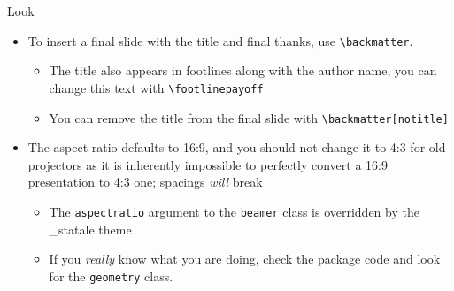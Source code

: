 \begin{frame}[fragile]{Look}
\begin{itemize}
    \item To insert a final slide with the title and final thanks, use \verb|\backmatter|.
    \begin{itemize}
        \item The title also appears in footlines along with the author name, you can change this text with \verb|\footlinepayoff|
        \item You can remove the title from the final slide with \verb|\backmatter[notitle]|
    \end{itemize}
    \item The aspect ratio defaults to 16:9, and you should not change it to 4:3 for old projectors as it is inherently impossible to perfectly convert a 16:9 presentation to 4:3 one; spacings \emph{will} break
    \begin{itemize}
        \item The \texttt{aspectratio} argument to the \texttt{beamer} class is overridden by the \_statale theme
        \item If you \emph{really} know what you are doing, check the package code and look for the \texttt{geometry} class.
    \end{itemize}
\end{itemize}
\end{frame}

\footlinecolor{}